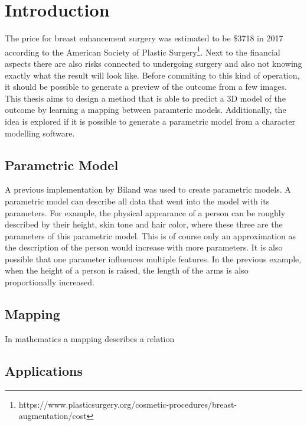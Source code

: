 \setcounter{chapter}{0}

\chapter{Introduction}

The price for breast enhancement surgery was estimated to be \$3718 in 2017 according to the American Society of Plastic Surgery\footnote{https://www.plasticsurgery.org/cosmetic-procedures/breast-augmentation/cost}. Next to the financial aspects there are also risks connected to undergoing surgery and also not knowing exactly what the result will look like. Before commiting to this kind of operation, it should be possible to generate a preview of the outcome from a few images. This thesis aims to design a method that is able to predict a 3D model of the outcome by learning a mapping between paramteric models. Additionally, the idea is explored if it is possible to generate a parametric model from a character modelling software.




\section{Parametric Model}
A previous implementation by Biland \cite{Biland17} was used to create parametric models. A parametric model can describe all data that went into the model with its parameters. For example, the physical appearance of a person can be roughly described by their height, skin tone and hair color, where these three are the parameters of this parametric model. This is of course only an approximation as the description of the person would increase with more parameters. It is also possible that one parameter influences multiple features. In the previous example, when the height of a person is raised, the length of the arms is also proportionally increased.

\section{Mapping}
In mathematics a mapping describes a relation

\section{Applications}
